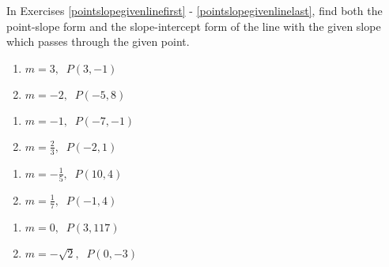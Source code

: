 \documentclass{ximera}
\begin{document}
	\author{Stitz-Zeager}


\label{ExercisesforAppLines}

In Exercises \ref{pointslopegivenlinefirst} - \ref{pointslopegivenlinelast}, find both the point-slope form and the slope-intercept form of the line with the given slope which passes through the given point.

\begin{multicols}{2}
\begin{enumerate}

\item $m = 3, \;\; P(3, -1)$ \label{pointslopegivenlinefirst}
\item $m = -2, \;\; P(-5, 8)$

\setcounter{HW}{\value{enumi}}
\end{enumerate}
\end{multicols}

\begin{multicols}{2}
\begin{enumerate}
\setcounter{enumi}{\value{HW}}

\item $m = -1, \;\; P(-7, -1)$
\item $m = \frac{2}{3}, \;\; P(-2, 1)$

\setcounter{HW}{\value{enumi}}
\end{enumerate}
\end{multicols}

\begin{multicols}{2}
\begin{enumerate}
\setcounter{enumi}{\value{HW}}

\item $m = -\frac{1}{5}, \;\; P(10, 4)$
\item $m = \frac{1}{7}, \;\; P(-1, 4)$

\setcounter{HW}{\value{enumi}}
\end{enumerate}
\end{multicols}

\begin{multicols}{2}
\begin{enumerate}
\setcounter{enumi}{\value{HW}}

\item $m = 0, \;\; P(3, 117)$
\item $m = -\sqrt{2}, \;\; P(0, -3)$

\setcounter{HW}{\value{enumi}}
\end{enumerate}
\end{multicols}
\end{document}
